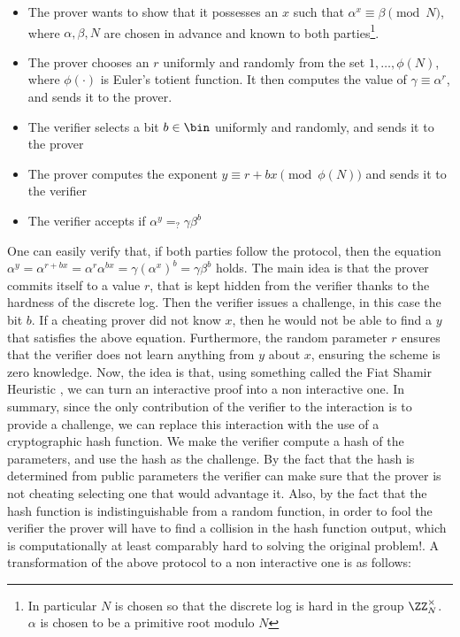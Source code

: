 \documentclass{article}
\begin{document}
\begin{itemize}
    \item The prover wants to show that it possesses an $x$ such that $\alpha^x \equiv \beta \pmod N$, where $\alpha, \beta, N$
          are chosen in advance and known to both parties\footnote{In particular $N$ is chosen so that the discrete log is hard in the group $\ZZ_N^\times$. $\alpha$ is chosen to be a primitive root modulo $N$}.
    \item The prover chooses an $r$ uniformly and randomly from the set $1, \dots, \phi(N)$, where $\phi(\cdot)$ is Euler's
          totient function. It then computes the value of $\gamma \equiv \alpha^r$, and sends it to the prover.
    \item The verifier selects a bit $b \in \bin$ uniformly and randomly, and sends it to the prover
    \item The prover computes the exponent $y \equiv r + bx \pmod{\phi(N)}$ and sends it to the verifier
    \item The verifier accepts if $\alpha^y =_? \gamma \beta^b $
\end{itemize}
One can easily verify that, if both parties follow the protocol, then the equation
$\alpha^y = \alpha^{r + bx} = \alpha^r \alpha^{bx} = \gamma (\alpha^x)^b = \gamma \beta^b$ holds.
The main idea is that the prover commits itself to a value $r$, that is kept hidden from the verifier thanks to
the hardness of the discrete log. Then the verifier issues a challenge, in this case the bit $b$. If a cheating prover
did not know $x$, then he would not be able to find a $y$ that satisfies the above equation. Furthermore, the random
parameter $r$ ensures that the verifier does not learn anything from $y$ about $x$, ensuring the scheme is zero knowledge.
Now, the idea is that, using something called the Fiat Shamir Heuristic \cite{fiatHowProveYourself1987}, we can turn an
interactive proof into a non interactive one. In summary, since the only contribution of the verifier to the interaction
is to provide a challenge, we can replace this interaction with the use of a cryptographic hash function.
We make the verifier compute a hash of the parameters, and use the hash as the challenge. By the fact that
the hash is determined from public parameters the verifier can make sure that the prover is not cheating selecting one
that would advantage it. Also, by the fact that the hash function is indistinguishable from a random function, in order to
fool the verifier the prover will have to find a collision in the hash function output, which is computationally at least
comparably hard to solving the original problem!.
A transformation of the above protocol
to a non interactive one is as follows:
\end{document}
